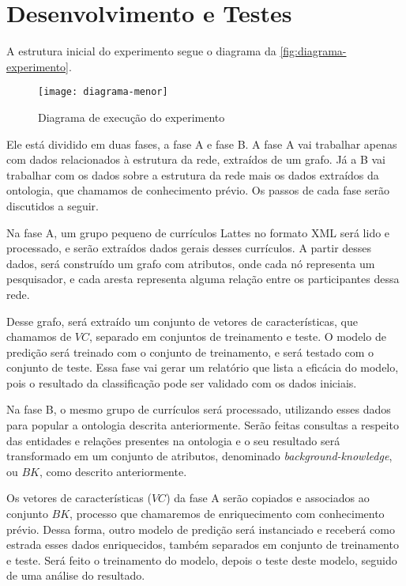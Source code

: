 \section{Desenvolvimento e Testes}
\label{sec:desenvolvimento-testes}

A estrutura inicial do experimento segue o diagrama da \autoref{fig:diagrama-experimento}.

\begin{figure}[!h]
  \centering
  \texttt{[image: diagrama-menor]}
  \caption{Diagrama de execução do experimento}
  \label{fig:diagrama-experimento}
\end{figure}

Ele está dividido em duas fases, a fase A e fase B. A fase A vai trabalhar apenas com dados relacionados à estrutura da rede, extraídos de um grafo. Já a B vai trabalhar com os dados sobre a estrutura da rede mais os dados extraídos da ontologia, que chamamos de conhecimento prévio. Os passos de cada fase serão discutidos a seguir.

Na fase A, um grupo pequeno de currículos Lattes no formato XML será lido e processado, e serão extraídos dados gerais desses currículos. A partir desses dados, será construído um grafo com atributos, onde cada nó representa um pesquisador, e cada aresta representa alguma relação entre os participantes dessa rede.

Desse grafo, será extraído um conjunto de vetores de características, que chamamos de $VC$, separado em conjuntos de treinamento e teste. O modelo de predição será treinado com o conjunto de treinamento, e será testado com o conjunto de teste. Essa fase vai gerar um relatório que lista a eficácia do modelo, pois o resultado da classificação pode ser validado com os dados iniciais.

Na fase B, o mesmo grupo de currículos será processado, utilizando esses dados para popular a ontologia descrita anteriormente. Serão feitas consultas a respeito das entidades e relações presentes na ontologia e o seu resultado será transformado em um conjunto de atributos, denominado \textit{background-knowledge}, ou $BK$, como descrito anteriormente.

Os vetores de características ($VC$) da fase A serão copiados e associados ao conjunto $BK$, processo que chamaremos de enriquecimento com conhecimento prévio. Dessa forma, outro modelo de predição será instanciado e receberá como estrada esses dados enriquecidos, também separados em conjunto de treinamento e teste. Será feito o treinamento do modelo, depois o teste deste modelo, seguido de uma análise do resultado.

